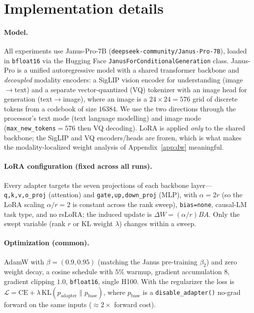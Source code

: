 \documentclass{article}
\begin{document}


\appendix

\section{Implementation details}
\label{app:impl}

\paragraph{Model.}
All experiments use Janus-Pro-7B (\texttt{deepseek-community/Janus-Pro-7B}),
loaded in \texttt{bfloat16} via the Hugging Face
\texttt{JanusForConditionalGeneration} class. Janus-Pro is a unified
autoregressive model with a shared transformer backbone and \emph{decoupled}
modality encoders: a SigLIP vision encoder for understanding (image$\to$text) and
a separate vector-quantized (VQ) tokenizer with an image head for generation
(text$\to$image), where an image is a $24\times24=576$ grid of discrete tokens
from a codebook of size $16384$. We use the two directions through the
processor's text mode (text language modelling) and image mode
(\texttt{max\_new\_tokens}$=576$ then VQ decoding). LoRA is applied \emph{only} to
the shared backbone; the SigLIP and VQ encoders/heads are frozen, which is what
makes the modality-localized weight analysis of Appendix~\ref{app:dw}
meaningful.

\paragraph{LoRA configuration (fixed across all runs).}
Every adapter targets the seven projections of each backbone layer---%
\texttt{q,k,v,o\_proj} (attention) and \texttt{gate,up,down\_proj} (MLP), with
$\alpha=2r$ (so the LoRA scaling $\alpha/r=2$ is constant across the rank sweep),
\texttt{bias=none}, causal-LM task type, and no rsLoRA; the induced update is
$\Delta W=(\alpha/r)BA$. Only the swept variable (rank $r$ or KL weight $\lambda$)
changes within a sweep.

\paragraph{Optimization (common).}
AdamW with $\beta=(0.9,0.95)$ (matching the Janus pre-training $\beta_2$) and zero
weight decay, a cosine schedule with $5\%$ warmup, gradient accumulation $8$,
gradient clipping $1.0$, \texttt{bfloat16}, single H100. With the regularizer the
loss is
$\mathcal{L}=\mathrm{CE}+\lambda\,\mathrm{KL}(p_{\text{adapter}}\|p_{\text{base}})$,
where $p_{\text{base}}$ is a \texttt{disable\_adapter()} no-grad forward on the
same inputs ($\approx$$2\times$ forward cost).
\end{document}
